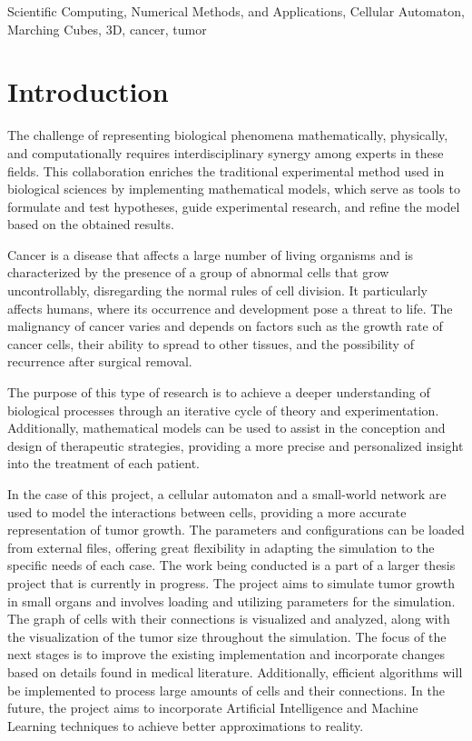 \documentclass[a4paper,11pt]{article}
\begin{document}
{{\vskip 0.2cm  %


{\small{ %
 Scientific Computing, Numerical Methods, and Applications, Cellular Automaton, Marching Cubes, 3D, cancer, tumor
}}
}


\section*{Introduction}

The challenge of representing biological phenomena mathematically, physically, and computationally requires interdisciplinary synergy among experts in these fields. This collaboration enriches the traditional experimental method used in biological sciences by implementing mathematical models, which serve as tools to formulate and test hypotheses, guide experimental research, and refine the model based on the obtained results.~\cite{7}

Cancer is a disease that affects a large number of living organisms and is characterized by the presence of a group of abnormal cells that grow uncontrollably, disregarding the normal rules of cell division. It particularly affects humans, where its occurrence and development pose a threat to life. The malignancy of cancer varies and depends on factors such as the growth rate of cancer cells, their ability to spread to other tissues, and the possibility of recurrence after surgical removal.

The purpose of this type of research is to achieve a deeper understanding of biological processes through an iterative cycle of theory and experimentation. Additionally, mathematical models can be used to assist in the conception and design of therapeutic strategies, providing a more precise and personalized insight into the treatment of each patient.

In the case of this project, a cellular automaton and a small-world network are used to model the interactions between cells, providing a more accurate representation of tumor growth. The parameters and configurations can be loaded from external files, offering great flexibility in adapting the simulation to the specific needs of each case. The work being conducted is a part of a larger thesis project that is currently in progress. The project aims to simulate tumor growth in small organs and involves loading and utilizing parameters for the simulation. The graph of cells with their connections is visualized and analyzed, along with the visualization of the tumor size throughout the simulation. The focus of the next stages is to improve the existing implementation and incorporate changes based on details found in medical literature. Additionally, efficient algorithms will be implemented to process large amounts of cells and their connections. In the future, the project aims to incorporate Artificial Intelligence and Machine Learning techniques to achieve better approximations to reality.

}
\end{document}
